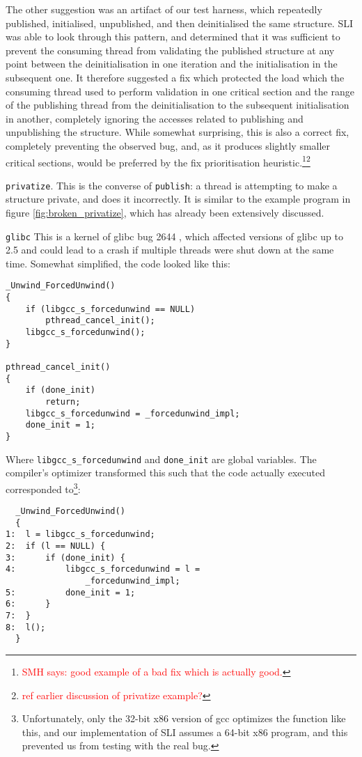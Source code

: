 \documentclass[10pt,twocolumn,preprint,natbib,authoryear]{sigplanconf}
\newcommand{\editorial}[1]{\textcolor{red}{\footnote{\textcolor{red}{#1}}}}
\newcommand{\smh}[1]{\editorial{SMH says: #1}}
\begin{document}
The other suggestion was an artifact of our test harness, which
repeatedly published, initialised, unpublished, and then deinitialised
the same structure.  SLI was able to look through this pattern, and
determined that it was sufficient to prevent the consuming thread from
validating the published structure at any point between the
deinitialisation in one iteration and the initialisation in the
subsequent one.  It therefore suggested a fix which protected the load
which the consuming thread used to perform validation in one critical
section and the range of the publishing thread from the
deinitialisation to the subsequent initialisation in another,
completely ignoring the accesses related to publishing and
unpublishing the structure.  While somewhat surprising, this is also a
correct fix, completely preventing the observed bug, and, as it
produces slightly smaller critical sections, would be preferred by the
fix prioritisation heuristic.\smh{good example of a bad fix which is
  actually good.}\editorial{ref earlier discussion of privatize example?}

\verb|privatize|.  This is the converse of \verb|publish|: a thread is
attempting to make a structure private, and does it incorrectly.  It
is similar to the example program in figure
\ref{fig:broken_privatize}, which has already been extensively
discussed.

\verb|glibc| This is a kernel of glibc bug 2644 \cite{glibc2644},
which affected versions of glibc up to 2.5 and could lead to a crash
if multiple threads were shut down at the same time.  Somewhat
simplified, the code looked like this:

\begin{verbatim}
_Unwind_ForcedUnwind()
{
    if (libgcc_s_forcedunwind == NULL)
        pthread_cancel_init();
    libgcc_s_forcedunwind();
}

pthread_cancel_init()
{
    if (done_init)
        return;
    libgcc_s_forcedunwind = _forcedunwind_impl;
    done_init = 1;
}
\end{verbatim}

Where \verb|libgcc_s_forcedunwind| and \verb|done_init| are global
variables.  The compiler's optimizer transformed this such that the
code actually executed corresponded to\footnote{Unfortunately, only
  the 32-bit x86 version of gcc optimizes the function like this, and
  our implementation of SLI assumes a 64-bit x86 program, and this
  prevented us from testing with the real bug.}:

\begin{verbatim}
  _Unwind_ForcedUnwind()
  {
1:  l = libgcc_s_forcedunwind;
2:  if (l == NULL) {
3:      if (done_init) {
4:          libgcc_s_forcedunwind = l =
                _forcedunwind_impl;
5:          done_init = 1;
6:      }
7:  }
8:  l();
  }
\end{verbatim}
\end{document}
